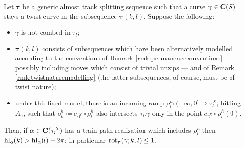 \begin{lemma}\label{lem:threeramps}
Let $\bm\tau$ be a generic almost track splitting sequence such that a curve $\gamma\in\mathbf C(S)$ stays a twist curve in the subsequence $\bm\tau(k,l)$. Suppose the following:
\begin{itemize}
\item $\gamma$ is not combed in $\tau_l$;
\item $\bm\tau(k,l)$ consists of subsequences which have been alternatively modelled according to the conventions of Remark \ref{rmk:permanenceconventions} --- possibly including moves which consist of trivial unzips --- and of Remark \ref{rmk:twistnaturemodelling} (the latter subsequences, of course, must be of twist nature);
\item under this fixed model, there is an incoming ramp $\rho_l^h: (-\infty,0]\rightarrow \tau_l^X$, hitting $A_\gamma$, such that $\rho_k^h\coloneqq c_{\tau_k^X}\circ \rho_l^h$ also intersects $\tau_l.\gamma$ only in the point $c_{\tau_k^X}\circ \rho_l^h(0)$.
\end{itemize}

Then, if $\alpha\in\mathbf C(\tau_l^X)$ has a train path realization which includes $\rho_l^h$ then $\mathrm{hl}_\alpha(k)> \mathrm{hl}_\alpha(l)-2\pi$; in particular $\mathrm{rot}_{\bm\tau}(\gamma;k,l)\leq 1$.
\end{lemma}
